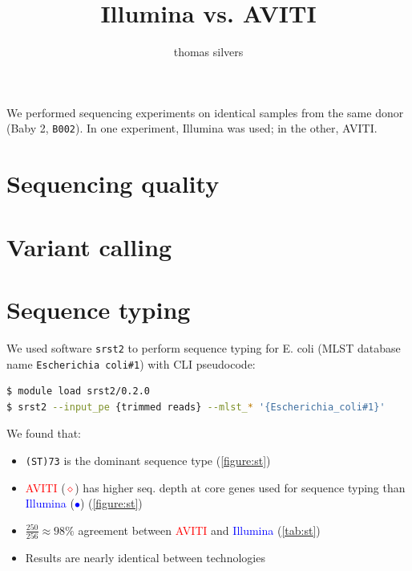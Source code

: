 \documentclass{article}
\title{Illumina vs. AVITI}
\author{thomas silvers}
\begin{document}
\maketitle

We performed sequencing experiments on identical samples from the same donor (Baby 2, \texttt{B002}). In one experiment, Illumina was used; in the other, AVITI.

\section{Sequencing quality}

\section{Variant calling}

\section{Sequence typing}

We used software \texttt{srst2} to perform sequence typing for E. coli (MLST database name \texttt{Escherichia coli\#1}) with CLI pseudocode:

\begin{lstlisting}[language=bash]
$ module load srst2/0.2.0
$ srst2 --input_pe {trimmed reads} --mlst_* '{Escherichia_coli#1}'
\end{lstlisting}

We found that:

\begin{itemize}
    \item \texttt{(ST)73} is the dominant sequence type (\cref{figure:st})
    \item \textcolor{red}{AVITI} (\textcolor{red}{$\diamond$}) has higher seq. depth at core genes used for sequence typing than \textcolor{blue}{Illumina} (\textcolor{blue}{$\bullet$}) (\cref{figure:st})
    \item $\frac{250}{256} \approx 98\%$ agreement between \textcolor{red}{AVITI} and \textcolor{blue}{Illumina} (\cref{tab:st})
    \item Results are nearly identical between technologies
\end{itemize}
\end{document}
